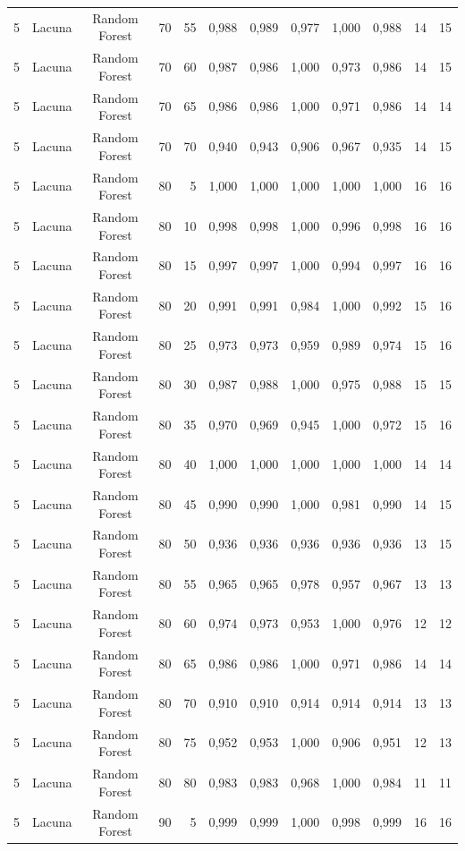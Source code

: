 \begin{longtable}{ccclrrrrrrrr}
5 & Lacuna & Random Forest & 70 & 55 & 0,988 & 0,989 & 0,977 & 1,000 & 0,988 & 14 & 15 \\
5 & Lacuna & Random Forest & 70 & 60 & 0,987 & 0,986 & 1,000 & 0,973 & 0,986 & 14 & 15 \\
5 & Lacuna & Random Forest & 70 & 65 & 0,986 & 0,986 & 1,000 & 0,971 & 0,986 & 14 & 14 \\
5 & Lacuna & Random Forest & 70 & 70 & 0,940 & 0,943 & 0,906 & 0,967 & 0,935 & 14 & 15 \\
5 & Lacuna & Random Forest & 80 & 5 & 1,000 & 1,000 & 1,000 & 1,000 & 1,000 & 16 & 16 \\
5 & Lacuna & Random Forest & 80 & 10 & 0,998 & 0,998 & 1,000 & 0,996 & 0,998 & 16 & 16 \\
5 & Lacuna & Random Forest & 80 & 15 & 0,997 & 0,997 & 1,000 & 0,994 & 0,997 & 16 & 16 \\
5 & Lacuna & Random Forest & 80 & 20 & 0,991 & 0,991 & 0,984 & 1,000 & 0,992 & 15 & 16 \\
5 & Lacuna & Random Forest & 80 & 25 & 0,973 & 0,973 & 0,959 & 0,989 & 0,974 & 15 & 16 \\
5 & Lacuna & Random Forest & 80 & 30 & 0,987 & 0,988 & 1,000 & 0,975 & 0,988 & 15 & 15 \\
5 & Lacuna & Random Forest & 80 & 35 & 0,970 & 0,969 & 0,945 & 1,000 & 0,972 & 15 & 16 \\
5 & Lacuna & Random Forest & 80 & 40 & 1,000 & 1,000 & 1,000 & 1,000 & 1,000 & 14 & 14 \\
5 & Lacuna & Random Forest & 80 & 45 & 0,990 & 0,990 & 1,000 & 0,981 & 0,990 & 14 & 15 \\
5 & Lacuna & Random Forest & 80 & 50 & 0,936 & 0,936 & 0,936 & 0,936 & 0,936 & 13 & 15 \\
5 & Lacuna & Random Forest & 80 & 55 & 0,965 & 0,965 & 0,978 & 0,957 & 0,967 & 13 & 13 \\
5 & Lacuna & Random Forest & 80 & 60 & 0,974 & 0,973 & 0,953 & 1,000 & 0,976 & 12 & 12 \\
5 & Lacuna & Random Forest & 80 & 65 & 0,986 & 0,986 & 1,000 & 0,971 & 0,986 & 14 & 14 \\
5 & Lacuna & Random Forest & 80 & 70 & 0,910 & 0,910 & 0,914 & 0,914 & 0,914 & 13 & 13 \\
5 & Lacuna & Random Forest & 80 & 75 & 0,952 & 0,953 & 1,000 & 0,906 & 0,951 & 12 & 13 \\
5 & Lacuna & Random Forest & 80 & 80 & 0,983 & 0,983 & 0,968 & 1,000 & 0,984 & 11 & 11 \\
5 & Lacuna & Random Forest & 90 & 5 & 0,999 & 0,999 & 1,000 & 0,998 & 0,999 & 16 & 16 \\

\end{longtable}
